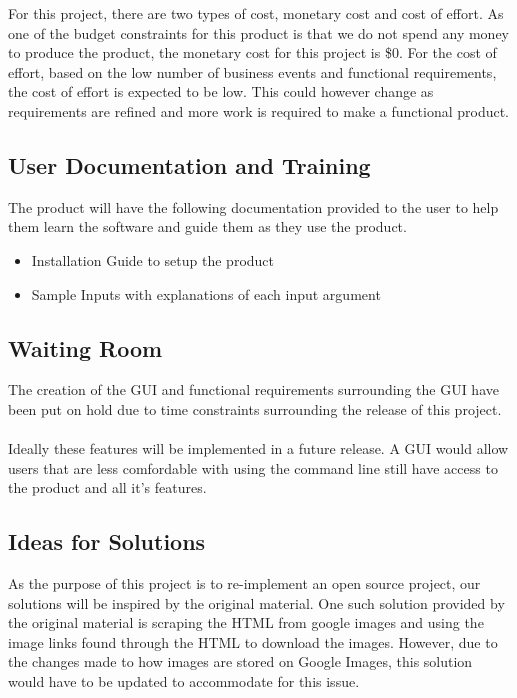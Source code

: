 \documentclass[12pt, titlepage]{article}
\begin{document}
For this project, there are two types of cost, monetary cost and cost of effort. As one of the budget constraints for this product is that we do not spend any money to produce the product, the monetary cost for this project is \$0. For the cost of effort, based on the low number of business events and functional requirements, the cost of effort is expected to be low. This could however change as requirements are refined and more work is required to make a functional product.

\subsection{User Documentation and Training}

The product will have the following documentation provided to the user to help them learn the software and guide them as they use the product.

\begin{itemize}
    \item Installation Guide to setup the product
    \item Sample Inputs with explanations of each input argument
\end{itemize}

\subsection{Waiting Room}

The creation of the GUI and functional requirements surrounding the GUI have been put on hold due to time constraints surrounding the release of this project.
\\ \\
Ideally these features will be implemented in a future release. A GUI would allow users that are less comfordable with using the command line still have access to the product and all it's features.

\subsection{Ideas for Solutions}

As the purpose of this project is to re-implement an open source project, our solutions will be inspired by the original material. One such solution provided by the original material is scraping the HTML from google images and using the image links found through the HTML to download the images. However, due to the changes made to how images are stored on Google Images, this solution would have to be updated to accommodate for this issue.
\end{document}
